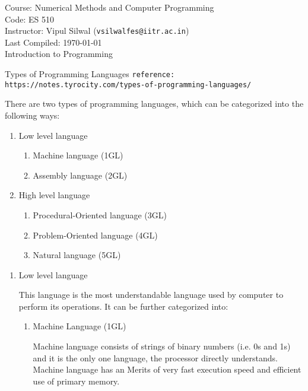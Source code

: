 \documentclass[11pt,titlepage,fleqn]{article}
\begin{document}
\noindent Course: Numerical Methods and Computer Programming\\
\noindent Code: ES 510\\
\noindent Instructor: Vipul Silwal (\verb+vsilwalfes@iitr.ac.in+) \\ 
\noindent Last Compiled: \today \\

{\huge Introduction to Programming}

 \tableofcontents 
\begin{section}{Types of Programming Languages}
\verb+reference: https://notes.tyrocity.com/types-of-programming-languages/+


There are two types of programming languages, which can be categorized into the following ways:
\begin{enumerate}
\item  Low level language
\begin{enumerate}
\item  Machine language (1GL)
\item  Assembly language (2GL)
\end{enumerate}
\item  High level language
\begin{enumerate}
\item  Procedural-Oriented language (3GL)
\item  Problem-Oriented language (4GL)
\item  Natural language (5GL)
\end{enumerate}
\end{enumerate}

\iffalse
\begin{enumerate}
 \item       Low level language

This language is the most understandable language used by computer to perform its operations. It can be further categorized into:
\begin{enumerate}
\item  Machine Language (1GL)

Machine language consists of strings of binary numbers (i.e. 0s and 1s) and it is the only one language, the processor directly understands. Machine language has an Merits of very fast execution speed and efficient use of primary memory.


\end{enumerate}
\end{enumerate}
\end{section}
\end{document}

